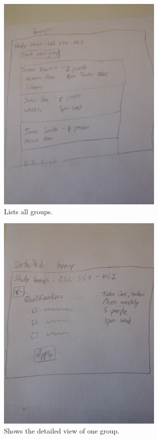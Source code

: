 \documentclass[conference]{IEEEtran}
\begin{document}
\begin{figure}[ht!]
\centering
\includegraphics[width=80mm]{figures/groups}
\caption{Lists all groups. \label{fig:groups}}
\end{figure}

\begin{figure}[ht!]
\centering
\includegraphics[width=80mm]{figures/detailedGroup}
\caption{Shows the detailed view of one group. \label{fig:detailedGroup}}
\end{figure}
\end{document}
